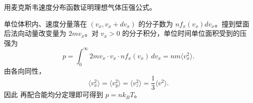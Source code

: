 \begin{question}
用麦克斯韦速度分布函数证明理想气体压强公式。
\begin{solution}
单位体积内、速度分量落在 $(v_x,v_x+dv_x)$ 的分子数为 $n f_x(v_x)dv_x$。撞到壁面后法向动量改变量为 $2mv_x$。对 $v_x>0$ 的分子积分，单位时间单位面积受到的压强为
\[
p=\int_0^{\infty}2mv_x\cdot v_x\cdot n f_x(v_x)\,dv_x
=nm\langle v_x^2\rangle.
\]
由各向同性，
\[
\langle v_x^2\rangle=\langle v_y^2\rangle=\langle v_z^2\rangle=\frac13\langle v^2\rangle.
\]
因此
再配合能均分定理即可得到 $p=nk_BT$。
\end{solution}
\end{question}



